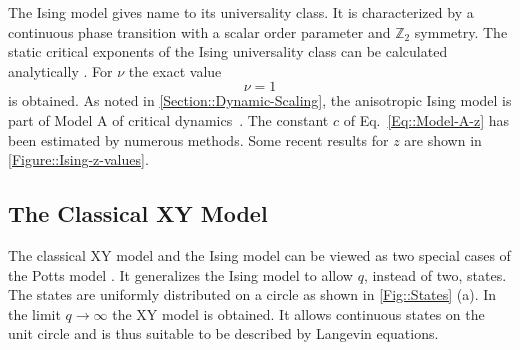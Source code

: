 	The Ising model gives name to its universality class. It is characterized by a continuous phase transition with a scalar order parameter and $\mathbb{Z}_2$ symmetry. The static critical exponents of the Ising universality class can be calculated analytically \cite{cardy1996scaling}. For $\nu$ the exact value
	\begin{equation}
		\nu =	1
	\end{equation}
	is obtained. As noted in \autoref{Section::Dynamic-Scaling}, the anisotropic Ising model is part of Model A of critical dynamics~\cite{hohenberg1977theory}. The constant $c$ of Eq.~\eqref{Eq::Model-A-z} has been estimated by numerous methods. Some recent results for $z$ are shown in \autoref{Figure::Ising-z-values}. \\
	\subsection{The Classical XY Model}
	The classical XY model and the Ising model can be viewed as two special cases of the Potts model \cite{potts1952some}. It generalizes the Ising model to allow $q$, instead of two, states. The states are uniformly distributed on a circle as shown in \autoref{Fig::States} (a). In the limit $q \rightarrow \infty$ the XY model is obtained. It allows continuous states on the unit circle and is thus suitable to be described by Langevin equations. \\
	

